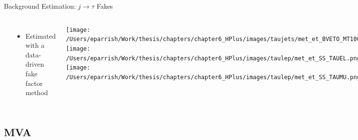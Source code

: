 \documentclass[aspectratio=169,xcolor=table]{beamer}
\begin{document}
\begin{frame}[t]{Background Estimation: $j \rightarrow \tau$ Fakes}
\begin{columns}[t]
\begin{table}[!thp]
{\begin{tabular}{| c | c | c | c |}
        \end{tabular}}
      \end{table}
      \begin{itemize}
        \item Estimated with a data-driven fake factor method 
      \end{itemize}

        \centering
          \texttt{[image: /Users/eparrish/Work/thesis/chapters/chapter6\_HPlus/images/taujets/met\_et\_BVETO\_MT100.png]}
          \texttt{[image: /Users/eparrish/Work/thesis/chapters/chapter6\_HPlus/images/taulep/met\_et\_SS\_TAUEL.png]}
          \texttt{[image: /Users/eparrish/Work/thesis/chapters/chapter6\_HPlus/images/taulep/met\_et\_SS\_TAUMU.png]}
      \end{columns}
    \end{frame}

  \subsection{ MVA }
\end{document}
